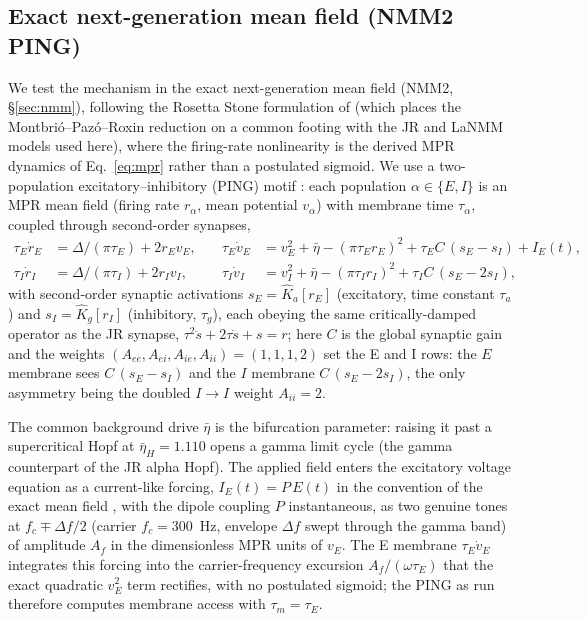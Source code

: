 \documentclass[11pt,a4paper]{article}
\begin{document}
\subsection{Exact next-generation mean field (NMM2 PING)}
We test the mechanism in the exact next-generation mean field (NMM2, \S\ref{sec:nmm}),
following the Rosetta Stone formulation of \cite{ruffini2025rosetta} (which places the
Montbri\'o--Paz\'o--Roxin reduction \cite{montbrio2015} on a common footing with the JR
and LaNMM models used here), where the firing-rate nonlinearity is the derived MPR
dynamics of Eq.~\eqref{eq:mpr} rather than a postulated sigmoid. We use a two-population
excitatory--inhibitory (PING) motif \cite{ruffini2021nmm2,clusella2023,ruffini2025rosetta}:
each population $\alpha\in\{E,I\}$ is an MPR mean field (firing rate $r_\alpha$, mean
potential $v_\alpha$) with membrane time $\tau_\alpha$, coupled through second-order
synapses,
\begin{equation}
\begin{aligned}
\tau_E\dot r_E&=\Delta/(\pi\tau_E)+2r_Ev_E, &\quad
\tau_E\dot v_E&=v_E^2+\bar\eta-(\pi\tau_E r_E)^2+\tau_E C\,(s_E-s_I)+I_E(t),\\[2pt]
\tau_I\dot r_I&=\Delta/(\pi\tau_I)+2r_Iv_I, &\quad
\tau_I\dot v_I&=v_I^2+\bar\eta-(\pi\tau_I r_I)^2+\tau_I C\,(s_E-2s_I),
\end{aligned}
\label{eq:nmm2-ping}
\end{equation}
with second-order synaptic activations $s_E=\hat K_a[r_E]$ (excitatory, time constant
$\tau_a$) and $s_I=\hat K_g[r_I]$ (inhibitory, $\tau_g$), each obeying the same
critically-damped operator as the JR synapse, $\tau^2\ddot s+2\tau\dot s+s=r$; here $C$
is the global synaptic gain and the weights $(A_{ee},A_{ei},A_{ie},A_{ii})=(1,1,1,2)$
set the E and I rows: the $E$ membrane sees $C\,(s_E-s_I)$ and the $I$ membrane
$C\,(s_E-2s_I)$, the only asymmetry being the doubled $I\!\to\!I$ weight $A_{ii}=2$.

The common background drive $\bar\eta$ is the bifurcation parameter: raising it
past a supercritical Hopf at $\bar\eta_H=1.110$ opens a gamma limit cycle (the gamma
counterpart of the JR alpha Hopf). The applied field enters the excitatory voltage equation
as a current-like forcing, $I_E(t)=P\,E(t)$ in the convention of the exact mean field
\cite{ruffini2021nmm2}, with the dipole coupling $P$ instantaneous, as two genuine tones at
$f_c\mp\Delta f/2$ (carrier $f_c=300$~Hz, envelope $\Delta f$ swept through the gamma band)
of amplitude $A_f$ in the dimensionless MPR units of $v_E$. The E membrane $\tau_E\dot v_E$
integrates this forcing into the carrier-frequency excursion $A_f/(\omega\tau_E)$ that the
exact quadratic $v_E^2$ term rectifies, with no postulated sigmoid; the PING as run
therefore computes membrane access with $\tau_m=\tau_E$.
\end{document}
